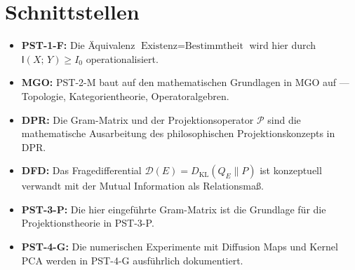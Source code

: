 \documentclass[11pt,a4paper]{article}
\theoremstyle{plain}
\theoremstyle{definition}
\newcommand{\MI}[2]{\mathsf{I}(#1;\,#2)}
\begin{document}
\section{Schnittstellen}

\begin{itemize}
  \item \textbf{PST-1-F:} Die \"{A}quivalenz $\text{Existenz} =
        \text{Bestimmtheit}$ wird hier durch $\MI{X}{Y} \geq I_0$
        operationalisiert.
  \item \textbf{MGO:} PST-2-M baut auf den mathematischen Grundlagen
        in MGO auf --- Topologie, Kategorientheorie, Operatoralgebren.
  \item \textbf{DPR:} Die Gram-Matrix und der Projektionsoperator
        $\mathcal{P}$ sind die mathematische Ausarbeitung des
        philosophischen Projektionskonzepts in DPR.
  \item \textbf{DFD:} Das Fragedifferential $\mathcal{D}(E) =
        D_{\mathrm{KL}}(Q_E \| P)$ ist konzeptuell verwandt mit der
        Mutual Information als Relationsma\ss{}.
  \item \textbf{PST-3-P:} Die hier eingef\"{u}hrte Gram-Matrix ist die
        Grundlage f\"{u}r die Projektionstheorie in PST-3-P.
  \item \textbf{PST-4-G:} Die numerischen Experimente mit Diffusion
        Maps und Kernel PCA werden in PST-4-G ausf\"{u}hrlich
        dokumentiert.
\end{itemize}
\end{document}
